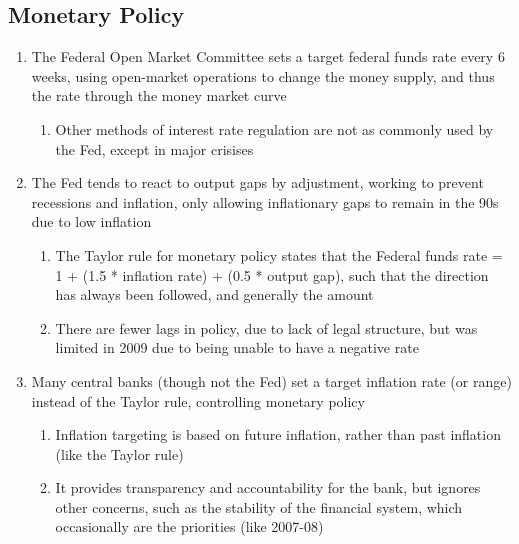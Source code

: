 \subsection{Monetary Policy}
\begin{enumerate}
\item The Federal Open Market Committee sets a target federal funds rate every 6 weeks, using open-market operations to change the money supply, and thus the rate through the money market curve
\begin{enumerate}
\item Other methods of interest rate regulation are not as commonly used by the Fed, except in major crisises
\end{enumerate}
\item The Fed tends to react to output gaps by adjustment, working to prevent recessions and inflation, only allowing inflationary gaps to remain in the 90s due to low inflation
\begin{enumerate}
\item The Taylor rule for monetary policy states that the Federal funds rate = 1 + (1.5 * inflation rate) + (0.5 * output gap), such that the direction has always been followed, and generally the amount
\item There are fewer lags in policy, due to lack of legal structure, but was limited in 2009 due to being unable to have a negative rate
\end{enumerate}
\item Many central banks (though not the Fed) set a target inflation rate (or range) instead of the Taylor rule, controlling monetary policy
\begin{enumerate}
\item Inflation targeting is based on future inflation, rather than past inflation (like the Taylor rule)
\item It provides transparency and accountability for the bank, but ignores other concerns, such as the stability of the financial system, which occasionally are the priorities (like 2007-08)
\end{enumerate}
\end{enumerate}

